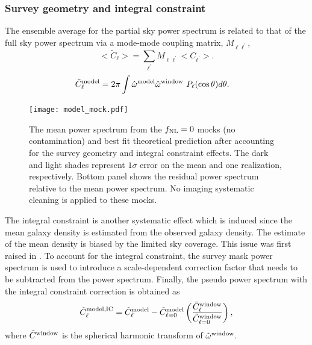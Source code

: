 \subsubsection{Survey geometry and integral constraint}
 The ensemble average for the partial sky power spectrum is related to that of the full sky power spectrum via a mode-mode coupling matrix, $M_{\ell \ell^{\prime}}$,
\begin{equation}\label{eq:mixm}
    <\tilde{C}_{\ell}> = \sum_{\ell^{\prime}} M_{\ell \ell^{\prime}}<C_{\ell^{\prime}}>.
\end{equation}
\begin{align}
    \tilde{C}^{\rm model}_{\ell} &= 2\pi \int \hat{\omega}^{\rm model}\hat{\omega}^{\rm window}~P_{\ell}(\cos \theta) d\theta.
\end{align}

 \begin{figure}
\centering
\texttt{[image: model\_mock.pdf]}
\caption{The mean power spectrum from the $f_{\rm NL}=0$ mocks (no contamination) and best fit theoretical prediction after accounting for the survey geometry and integral constraint effects. The dark and light shades represent $1\sigma$ error on the mean and one realization, respectively. Bottom panel shows the residual power spectrum relative to the mean power spectrum. No imaging systematic cleaning is applied to these mocks.}\label{fig:model_mock}
\end{figure}

The integral constraint is another systematic effect which is induced since the mean galaxy density is estimated from the observed galaxy density. The estimate of the mean density is biased by the limited sky coverage. This issue was first raised in \cite{peacock1991large}. To account for the integral constraint, the survey mask power spectrum is used to introduce a scale-dependent correction factor that needs to be subtracted from the power spectrum. Finally, the pseudo power spectrum with the integral constraint correction is obtained as
\begin{equation}
     \tilde{C}^{\rm model, IC}_{\ell} = \tilde{C}^{\rm model}_{\ell} - \tilde{C}^{\rm model}_{\ell=0} \left(\frac{\tilde{C}^{\rm window}_{\ell}}{\tilde{C}^{\rm window}_{\ell=0}}\right),
\end{equation}
where $\tilde{C}^{\rm window}$ is the spherical harmonic transform of $\hat{\omega}^{\rm window}$.

